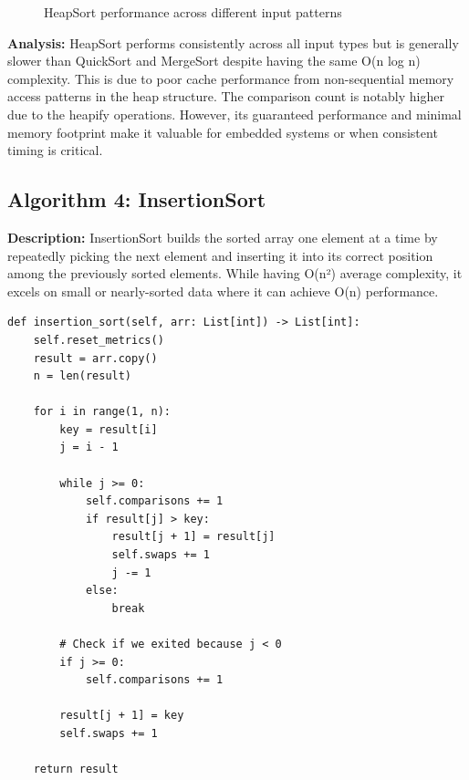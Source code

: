 \documentclass[12pt]{article}
\begin{document}
\begin{figure}[H]
    \centering
    \caption{HeapSort performance across different input patterns}
    \label{fig:heapsort_datatypes}
\end{figure}

\textbf{Analysis:} HeapSort performs consistently across all input types but is generally slower than QuickSort and MergeSort despite having the same O(n log n) complexity. This is due to poor cache performance from non-sequential memory access patterns in the heap structure. The comparison count is notably higher due to the heapify operations. However, its guaranteed performance and minimal memory footprint make it valuable for embedded systems or when consistent timing is critical.

\clearpage
\subsection{Algorithm 4: InsertionSort}

\textbf{Description:} InsertionSort builds the sorted array one element at a time by repeatedly picking the next element and inserting it into its correct position among the previously sorted elements. While having O(n²) average complexity, it excels on small or nearly-sorted data where it can achieve O(n) performance.

\begin{lstlisting}[caption={InsertionSort Implementation}]
def insertion_sort(self, arr: List[int]) -> List[int]:
    self.reset_metrics()
    result = arr.copy()
    n = len(result)
    
    for i in range(1, n):
        key = result[i]
        j = i - 1
        
        while j >= 0:
            self.comparisons += 1
            if result[j] > key:
                result[j + 1] = result[j]
                self.swaps += 1
                j -= 1
            else:
                break
        
        # Check if we exited because j < 0
        if j >= 0:
            self.comparisons += 1
        
        result[j + 1] = key
        self.swaps += 1
    
    return result
\end{lstlisting}
\end{document}
